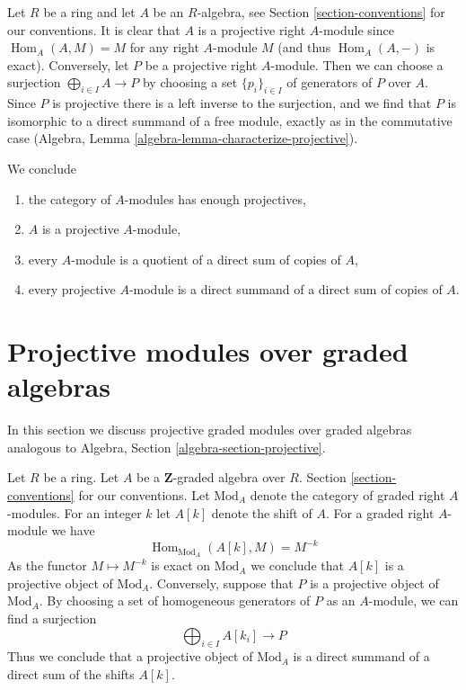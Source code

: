 \documentclass{stacks-project}
\theoremstyle{plain}
\theoremstyle{definition}
\theoremstyle{remark}
\numberwithin{equation}{subsection}
\def\Hom{\mathop{\mathrm{Hom}}\nolimits}
\begin{document}
\medskip\noindent
Let $R$ be a ring and let $A$ be an $R$-algebra, see
Section \ref{section-conventions} for our conventions.
It is clear that $A$ is a projective right $A$-module since
$\Hom_A(A, M) = M$ for any right $A$-module $M$ (and thus $\Hom_A(A, -)$
is exact). Conversely, let $P$ be a projective right $A$-module. Then
we can choose a surjection
$\bigoplus_{i \in I} A \to P$ by choosing a set $\{p_i\}_{i \in I}$
of generators of $P$ over $A$. Since $P$ is projective there is a
left inverse to the surjection, and we find that $P$ is isomorphic
to a direct summand of a free module, exactly as in the commutative case
(Algebra, Lemma \ref{algebra-lemma-characterize-projective}).

\medskip\noindent
We conclude
\begin{enumerate}
\item the category of $A$-modules has enough projectives,
\item $A$ is a projective $A$-module,
\item every $A$-module is a quotient of a direct sum of copies of $A$,
\item every projective $A$-module is a direct summand of a direct
sum of copies of $A$.
\end{enumerate}



\section{Projective modules over graded algebras}
\label{section-projectives-over-graded-algebras}

\noindent
In this section we discuss projective graded modules over graded algebras
analogous to Algebra, Section \ref{algebra-section-projective}.

\medskip\noindent
Let $R$ be a ring. Let $A$ be a $\mathbf{Z}$-graded algebra over $R$.
Section \ref{section-conventions} for our conventions.
Let $\text{Mod}_A$ denote the category of graded right $A$-modules.
For an integer $k$ let $A[k]$ denote the shift of $A$.
For a graded right $A$-module we have
$$
\Hom_{\text{Mod}_A}(A[k], M) = M^{-k}
$$
As the functor $M \mapsto M^{-k}$ is exact on $\text{Mod}_A$ we
conclude that $A[k]$ is a projective object of $\text{Mod}_A$.
Conversely, suppose that $P$ is a projective object of $\text{Mod}_A$.
By choosing a set of homogeneous generators of $P$ as an $A$-module,
we can find a surjection
$$
\bigoplus\nolimits_{i \in I} A[k_i] \longrightarrow P
$$
Thus we conclude that a projective object of $\text{Mod}_A$ is
a direct summand of a direct sum of the shifts $A[k]$.
\end{document}
